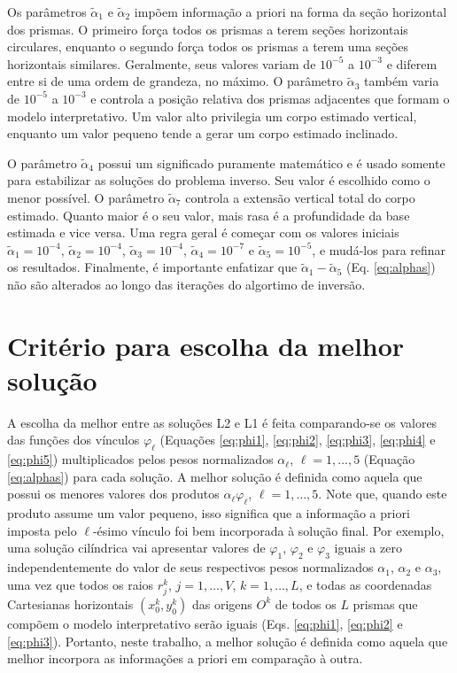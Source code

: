 Os parâmetros $\tilde{\alpha}_1$ e $\tilde{\alpha}_2$ impõem informação a priori na forma da seção horizontal dos prismas.
O primeiro força todos os prismas a terem seções horizontais circulares, enquanto o segundo força todos os prismas a terem uma seções horizontais similares.
Geralmente, seus valores variam de $10^{-5}$ a $10^{-3}$ e diferem entre si de uma ordem de grandeza, no máximo.
O parâmetro $\tilde{\alpha}_3$ também varia de $10^{-5}$ a $10^{-3}$ e controla a posição relativa dos prismas adjacentes que formam o modelo interpretativo.
Um valor alto privilegia um corpo estimado vertical, enquanto um valor pequeno tende a gerar um corpo estimado inclinado.

O parâmetro $\tilde{\alpha}_4$ possui um significado puramente matemático e é usado somente para estabilizar as soluções do problema inverso.
Seu valor é escolhido como o menor possível.
O parâmetro $\tilde{\alpha}_7$ controla a extensão vertical total do corpo estimado.
Quanto maior é o seu valor, mais rasa é a profundidade da base estimada e vice versa.
Uma regra geral é começar com os valores iniciais $\tilde{\alpha}_1 = 10^{-4}$, $\tilde{\alpha}_2 = 10^{-4}$, $\tilde{\alpha}_3 = 10^{-4}$, $\tilde{\alpha}_4 = 10^{-7}$ e $\tilde{\alpha}_5 = 10^{-5}$, e mudá-los para refinar os resultados.
Finalmente, é importante enfatizar que  $\tilde{\alpha}_1 - \tilde{\alpha}_5$ (Eq. \ref{eq:alphas}) não são alterados ao longo das iterações do algortimo de inversão.

\section{Critério para escolha da melhor solução}
\label{sec:criterio}

A escolha da melhor entre as soluções L2 e L1 é feita comparando-se os valores das funções dos vínculos $ \varphi_\ell $ (Equações \ref{eq:phi1}, \ref{eq:phi2}, \ref{eq:phi3}, \ref{eq:phi4} e \ref{eq:phi5}) multiplicados pelos pesos normalizados $ \alpha_\ell $, $ \ell=1,\dots,5 $ (Equação \ref{eq:alphas}) para cada solução.
A melhor solução é definida como aquela que possui os menores valores dos produtos $ \alpha_\ell \varphi_\ell  $, $ \ell=1,\dots,5 $.
Note que, quando este produto assume um valor pequeno, isso significa que a informação a priori imposta pelo $ \ell $-ésimo vínculo foi bem incorporada à solução final.
Por exemplo, uma solução cilíndrica vai apresentar valores de $ \varphi_1 $, $ \varphi_2 $ e $ \varphi_3 $ iguais a zero independentemente do valor de seus respectivos pesos normalizados $ \alpha_1 $, $ \alpha_2 $ e $ \alpha_3 $, uma vez que todos os raios $ r^k_j $, $ j=1, \dots, V $, $ k=1,\dots,L $, e todas as coordenadas Cartesianas horizontais $ (x^k_0, y^k_0) $ das origens $ O^k $ de todos os $ L $ prismas que compõem o modelo interpretativo serão iguais (Eqs. \ref{eq:phi1}, \ref{eq:phi2} e \ref{eq:phi3}).
Portanto, neste trabalho, a melhor solução é definida como aquela que melhor incorpora as informações a priori em comparação à outra.